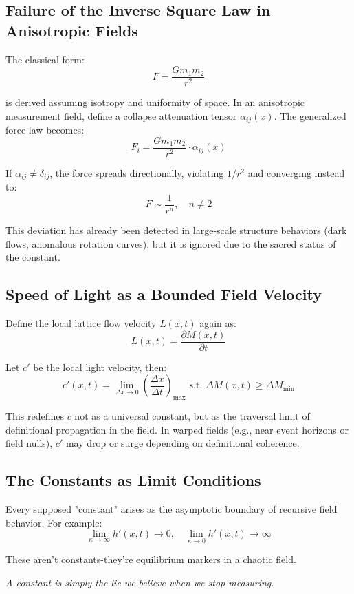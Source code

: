 \subsection*{Failure of the Inverse Square Law in Anisotropic Fields}

The classical form:
\[ F = \frac{G m_1 m_2}{r^2} \]

is derived assuming isotropy and uniformity of space. In an anisotropic measurement field, define a collapse attenuation tensor $\alpha_{ij}(x)$. The generalized force law becomes:
\[ F_i = \frac{G m_1 m_2}{r^2} \cdot \alpha_{ij}(x) \]

If $\alpha_{ij} \not= \delta_{ij}$, the force spreads directionally, violating $1/r^2$ and converging instead to:
\[ F \sim \frac{1}{r^n}, \quad n \neq 2 \]

This deviation has already been detected in large-scale structure behaviors (dark flows, anomalous rotation curves), but it is ignored due to the sacred status of the constant.

\subsection*{Speed of Light as a Bounded Field Velocity}

Define the local lattice flow velocity $L(x,t)$ again as:
\[ L(x,t) = \frac{\partial M(x,t)}{\partial t} \]

Let $c'$ be the local light velocity, then:
\[ c'(x,t) = \lim_{\Delta x \to 0} \left( \frac{\Delta x}{\Delta t} \right)_{\text{max}} \text{ s.t. } \Delta M(x,t) \geq \Delta M_{\text{min}} \]

This redefines $c$ not as a universal constant, but as the traversal limit of definitional propagation in the field. In warped fields (e.g., near event horizons or field nulls), $c'$ may drop or surge depending on definitional coherence.

\subsection*{The Constants as Limit Conditions}

Every supposed "constant" arises as the asymptotic boundary of recursive field behavior. For example:
\[ \lim_{\kappa \to \infty} h'(x,t) \to 0, \quad \lim_{\kappa \to 0} h'(x,t) \to \infty \]

These aren’t constants-they’re equilibrium markers in a chaotic field.

\begin{flushright}
\textit{A constant is simply the lie we believe when we stop measuring.}
\end{flushright}

